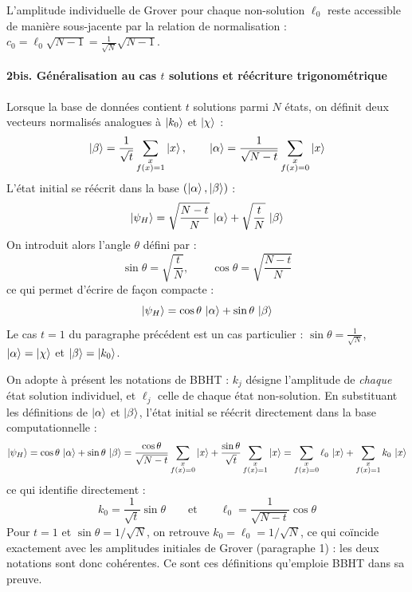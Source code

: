 \documentclass{ceri/sty/rapport}
\begin{document}
L'amplitude individuelle de Grover pour chaque non-solution $\ell_0$ reste accessible de manière sous-jacente par la relation de normalisation : $c_0 = \ell_0 \sqrt{N-1} = \frac{1}{\sqrt{N}}\sqrt{N-1}$.

\paragraph{2bis. Généralisation au cas $t$ solutions et réécriture trigonométrique}
Lorsque la base de données contient $t$ solutions parmi $N$ états, on définit deux vecteurs normalisés analogues à $\ket{k_0}$ et $\ket{\chi}$ :
\[
\ket{\beta} = \frac{1}{\sqrt{t}} \sum_{\substack{x \\ f(x)=1}} \ket{x}, \qquad
\ket{\alpha} = \frac{1}{\sqrt{N-t}} \sum_{\substack{x \\ f(x)=0}} \ket{x}
\]
L'état initial se réécrit dans la base $(\ket{\alpha}, \ket{\beta})$ :
\[
\ket{\psi_H} = \sqrt{\frac{N-t}{N}}\,\ket{\alpha} + \sqrt{\frac{t}{N}}\,\ket{\beta}
\]
On introduit alors l'angle $\theta$ défini par :
\[
\sin\theta = \sqrt{\frac{t}{N}}, \qquad \cos\theta = \sqrt{\frac{N-t}{N}}
\]
ce qui permet d'écrire de façon compacte :
\[
\ket{\psi_H} = \cos\theta\,\ket{\alpha} + \sin\theta\,\ket{\beta}
\]
Le cas $t = 1$ du paragraphe précédent est un cas particulier : $\sin\theta = \frac{1}{\sqrt{N}}$, $\ket{\alpha} = \ket{\chi}$ et $\ket{\beta} = \ket{k_0}$.

On adopte à présent les notations de BBHT : $k_j$ désigne l'amplitude de \emph{chaque} état solution individuel, et $\ell_j$ celle de chaque état non-solution. En substituant les définitions de $\ket{\alpha}$ et $\ket{\beta}$, l'état initial se réécrit directement dans la base computationnelle :
\[
\ket{\psi_H}
= \cos\theta\,\ket{\alpha} + \sin\theta\,\ket{\beta}
= \frac{\cos\theta}{\sqrt{N-t}}\sum_{\substack{x\\f(x)=0}}\ket{x}
+ \frac{\sin\theta}{\sqrt{t}}\sum_{\substack{x\\f(x)=1}}\ket{x}
= \sum_{\substack{x\\f(x)=0}}\ell_0\,\ket{x}
+ \sum_{\substack{x\\f(x)=1}}k_0\,\ket{x}
\]
ce qui identifie directement :
\[
k_0 = \frac{1}{\sqrt{t}}\sin\theta \qquad \text{et} \qquad \ell_0 = \frac{1}{\sqrt{N-t}}\cos\theta
\]
Pour $t = 1$ et $\sin\theta = 1/\sqrt{N}$, on retrouve $k_0 = \ell_0 = 1/\sqrt{N}$, ce qui coïncide exactement avec les amplitudes initiales de Grover (paragraphe 1) : les deux notations sont donc cohérentes. Ce sont ces définitions qu'emploie BBHT dans sa preuve.
\end{document}
